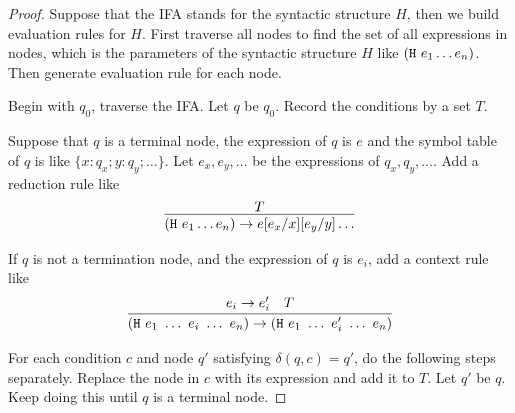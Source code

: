 \begin{proof}

    Suppose that the IFA stands for the syntactic structure $H$, then we build evaluation rules for $H$. First traverse all nodes to find the set of all expressions in nodes, which is the parameters of the syntactic structure $H$ like $(\mbox{\tt H}~e_1 \ldots e_n)$. Then generate evaluation rule for each node.

    Begin with $q_0$, traverse the IFA. Let $q$ be $q_0$. Record the conditions by a set $T$.

    Suppose that $q$ is a terminal node, the expression of $q$ is $e$ and the symbol table of $q$ is like $\{x:q_x; y:q_y; \ldots\}$. Let $e_x,e_y,\ldots$ be the expressions of $q_x, q_y, \ldots$. Add a reduction rule like
    \[
        \infer{(\m{H}~e_1 \ldots e_n) \to e[e_x/x][e_y/y]\ldots}{T}
    \]

    If $q$ is not a termination node, and the expression of $q$ is $e_i$, add a context rule like
    \[
        \infer{(\m{H}~e_1~\ldots~e_i~\ldots~e_n) \to (\m{H}~e_1~\ldots~e_i'~\ldots~e_n)}{e_i \to e_i' \quad T}
    \]


    For each condition $c$ and node $q'$ satisfying $\delta(q, c)=q'$, do the following steps separately. Replace the node in $c$ with its expression and add it to $T$. Let $q'$ be $q$. Keep doing this until $q$ is a terminal node.
\end{proof}


